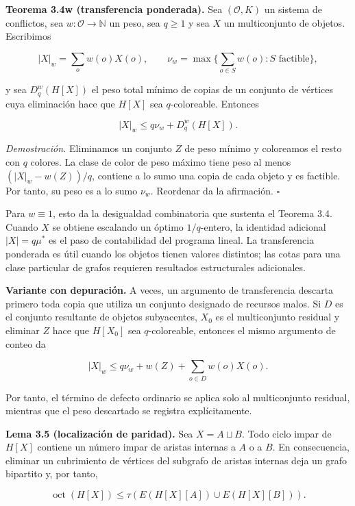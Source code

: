 \documentclass[spanish,11pt,a4paper]{article}
\begin{document}
\textbf{Teorema 3.4w (transferencia ponderada).} Sea \((\mathcal O,K)\)
un sistema de conflictos, sea \(w:\mathcal O\to\mathbb N\) un peso, sea
\(q\ge1\) y sea \(X\) un multiconjunto de objetos. Escribimos

\[
|X|_w=\sum_o w(o)X(o),
\qquad
\nu_w=\max\Big\{\sum_{o\in S}w(o):S\text{ factible}\Big\},
\]

y sea \(D_q^w(H[X])\) el peso total mínimo de copias de un conjunto de
vértices cuya eliminación hace que \(H[X]\) sea \(q\)-coloreable.
Entonces

\[
|X|_w\le q\nu_w+D_q^w(H[X]).
\]

\emph{Demostración.} Eliminamos un conjunto \(Z\) de peso mínimo y
coloreamos el resto con \(q\) colores. La clase de color de peso máximo
tiene peso al menos \((|X|_w-w(Z))/q\), contiene a lo sumo una copia de
cada objeto y es factible. Por tanto, su peso es a lo sumo \(\nu_w\).
Reordenar da la afirmación. \(\square\)

Para \(w\equiv1\), esto da la desigualdad combinatoria que sustenta el
Teorema 3.4. Cuando \(X\) se obtiene escalando un óptimo \(1/q\)-entero,
la identidad adicional \(|X|=q\mu^*\) es el paso de contabilidad del
programa lineal. La transferencia ponderada es útil cuando los objetos
tienen valores distintos; las cotas para una clase particular de grafos
requieren resultados estructurales adicionales.

\textbf{Variante con depuración.} A veces, un argumento de transferencia
descarta primero toda copia que utiliza un conjunto designado de
recursos malos. Si \(D\) es el conjunto resultante de objetos
subyacentes, \(X_0\) es el multiconjunto residual y eliminar \(Z\) hace
que \(H[X_0]\) sea \(q\)-coloreable, entonces el mismo argumento de
conteo da

\[
 |X|_w\le q\nu_w+w(Z)+\sum_{o\in D}w(o)X(o).
\]

Por tanto, el término de defecto ordinario se aplica solo al
multiconjunto residual, mientras que el peso descartado se registra
explícitamente.

\textbf{Lema 3.5 (localización de paridad).} Sea \(X=A\sqcup B\). Todo
ciclo impar de \(H[X]\) contiene un número impar de aristas internas a
\(A\) o a \(B\). En consecuencia, eliminar un cubrimiento de vértices
del subgrafo de aristas internas deja un grafo bipartito y, por tanto,

\[
\operatorname{oct}(H[X])
\le
\tau\!\left(E(H[X][A])\cup E(H[X][B])\right).
\]
\end{document}
